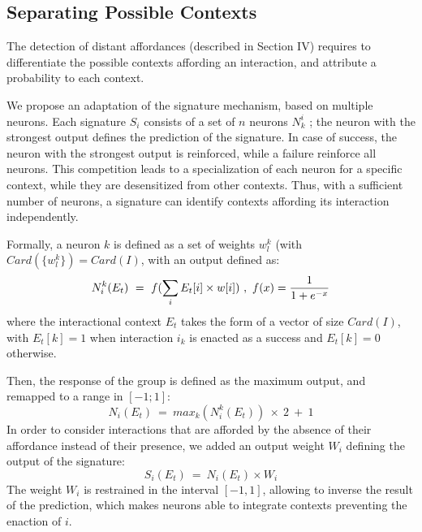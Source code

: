 \documentclass[conference]{IEEEtran}
\begin{document}


\subsection{Separating Possible Contexts}

The detection of distant affordances (described in Section IV) requires to differentiate the possible contexts affording an interaction, and attribute a probability to each context.

We propose an adaptation of the signature mechanism, based on multiple neurons. Each signature $S_i$ consists of a set of $n$ neurons $N_k^i$ ; the neuron with the strongest output defines the prediction of the signature. In case of success, the neuron with the strongest output is reinforced, while a failure reinforce all neurons. This competition leads to a specialization of each neuron for a specific context, while they are desensitized from other contexts. Thus, with a sufficient number of neurons, a signature can identify contexts affording its interaction independently.

Formally, a neuron $k$ is defined as a set of weights $w_l^k$ (with $Card(\{w_l^k\})=Card(I)$, with an output defined as:
\begin{equation}
N_i^k(E_t)~=~f(\sum_{i} E_t[i] \times w[i])~,~ f(x) = { {1}\over{1+e^{-x} }}
\end{equation}
where the interactional context $E_t$ takes the form of a vector of size $Card(I)$, with $E_t[k]=1$ when interaction $i_k$ is enacted as a success and $E_t[k]=0$ otherwise.

Then, the response of the group is defined as the maximum output, and remapped to a range in $[-1;1]$:
\begin{equation}
N_i(E_t)~=~max_k (N_i^k(E_t) ) \: \times \: 2 ~+~ 1
\end{equation}
In order to consider interactions that are afforded by the absence of their affordance instead of their presence, we added an output weight $W_i$ defining the output of the signature:
\begin{equation}
S_i(E_t)~=~N_i(E_t) \times W_i
\end{equation}
The weight $W_i$ is restrained in the interval $[-1,1]$, allowing to inverse the result of the prediction, which makes neurons able to integrate contexts preventing the enaction of $i$.
\end{document}
